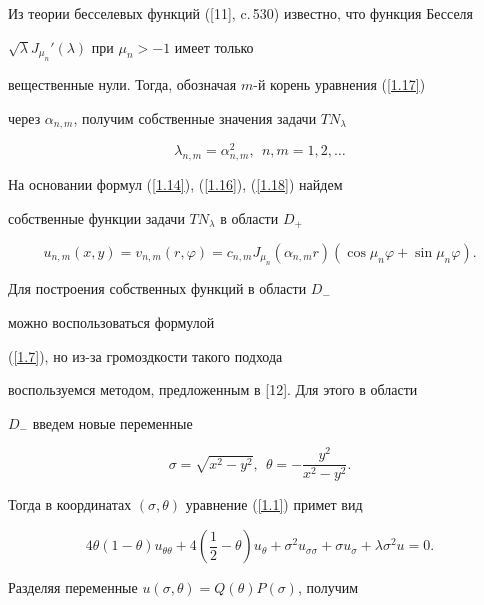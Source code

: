 Из теории бесселевых функций ([11], c.\,530) известно, что функция Бесселя 


$\sqrt\lambda J_{\mu_n}'(\lambda)$ при $\mu_n>-1$ имеет только 


вещественные нули. Тогда, обозначая $m$-й корень уравнения (\ref{1.17})


через $\alpha_{n,m}$, получим собственные значения задачи $TN_\lambda$


\begin{equation}


\lambda_{n,m}=\alpha^2_{n,m},\ \ n,m=1,2,\dotsc\label{1.18}


\end{equation}





На основании формул (\ref{1.14}), (\ref{1.16}), (\ref{1.18}) найдем 


собственные функции задачи $TN_\lambda$ в области $D_+$


\begin{equation}


u_{n,m}(x,y)=v_{n,m}(r,\varphi)=c_{n,m}J_{\mu_n}(\alpha_{n,m}r)(\cos


\mu_n\varphi+\sin\mu_n\varphi).\label{1.19}


\end{equation}





Для построения собственных функций в области $D_-$


можно воспользоваться формулой


(\ref{1.7}), но из-за громоздкости такого подхода


воспользуемся методом, предложенным в [12]. Для этого в области 


$D_-$ введем новые переменные


$$


\sigma=\sqrt{x^2-y^2},\ \ \theta=-\frac{y^2}{x^2-y^2}.


$$


Тогда в координатах $(\sigma,\theta)$ уравнение (\ref{1.1}) примет вид 


$$


4\theta(1-\theta )u_{\theta\theta}+4\left(\frac12-\theta\right)u_\theta +


\sigma^2u_{\sigma\sigma}+\sigma u_\sigma+\lambda\sigma^2 u = 0.


$$


Разделяя переменные $u(\sigma,\theta) = Q(\theta)P(\sigma)$, получим


